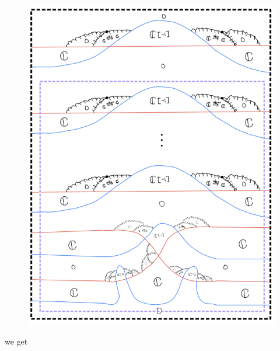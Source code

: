 \begin{enumerate}[label = (\roman*)]
\begin{enumerate}[label = (Case \arabic*)]
\begin{enumerate}[label = (Step \arabic*)]
\begin{figure}[H]
    \centering
    \includegraphics[scale = 0.95]{diagrams/cobord_gen/9.png}
    \caption{}
    \label{fig:your-label}
\end{figure}

we get


\end{enumerate}
\end{enumerate}
\end{enumerate}
